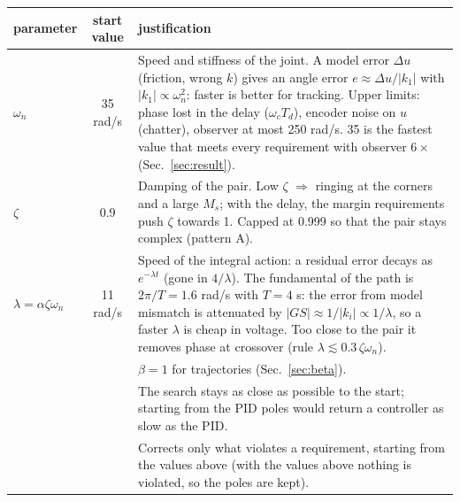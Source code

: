 \documentclass[10pt,a4paper]{article}
\newcommand{\code}[1]{\texttt{\detokenize{#1}}}
\begin{document}
\begin{tabularx}{\linewidth}{@{}l c X@{}}
\toprule
parameter & start value & justification \\
\midrule
$\omega_n$ & 35 rad/s &
  Speed and stiffness of the joint. A model error $\Delta u$ (friction, wrong $k$) gives an angle error
  $e\approx\Delta u/|k_1|$ with $|k_1|\propto\omega_n^2$: faster is better for tracking. Upper limits: phase lost in the
  delay ($\omega_cT_d$), encoder noise on $u$ (chatter), observer at most 250 rad/s. 35 is the fastest value that meets
  every requirement with observer $6\times$ (Sec.~\ref{sec:result}). \\
$\zeta$ & 0.9 &
  Damping of the pair. Low $\zeta$ $\Rightarrow$ ringing at the corners and a large $M_s$; with the delay, the margin
  requirements push $\zeta$ towards 1. Capped at 0.999 so that the pair stays complex (pattern A). \\
$\lambda=\alpha\zeta\omega_n$ & 11 rad/s &
  Speed of the integral action: a residual error decays as $e^{-\lambda t}$ (gone in $4/\lambda$). The fundamental of the
  path is $2\pi/T=1.6$ rad/s with $T=4$ s: the error from model mismatch is attenuated by $|GS|\approx1/|k_i|\propto
  1/\lambda$, so a faster $\lambda$ is cheap in voltage. Too close to the pair it removes phase at crossover
  (rule $\lambda\lesssim0.3\,\zeta\omega_n$). \\
\code{beta_mode} & \code{'one'} &
  $\beta=1$ for trajectories (Sec.~\ref{sec:beta}). \\
\code{start_from_pid} & \code{false} &
  The search stays as close as possible to the start; starting from the PID poles would return a controller as slow as the
  PID. \\
\code{do_search} & \code{true} &
  Corrects only what violates a requirement, starting from the values above (with the values above nothing is violated,
  so the poles are kept). \\
\bottomrule
\end{tabularx}
\end{document}
